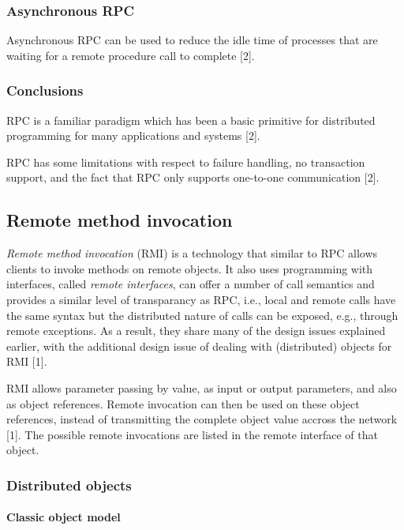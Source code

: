 \subsubsection{Asynchronous RPC}

Asynchronous RPC can be used to reduce the idle time of processes that are waiting for a remote procedure call to complete [2].



\subsubsection{Conclusions}

RPC is a familiar paradigm which has been a basic primitive for distributed programming for many applications and systems [2].

RPC has some limitations with respect to failure handling, no transaction support, and the fact that RPC only supports one-to-one communication [2].



\subsection{Remote method invocation}

\emph{Remote method invocation} (RMI) is a technology that similar to RPC allows clients to invoke methods on remote objects. It also uses programming with interfaces, called \emph{remote interfaces}, can offer a number of call semantics and provides a similar level of transparancy as RPC, i.e., local and remote calls have the same syntax but the distributed nature of calls can be exposed, e.g., through remote exceptions. As a result, they share many of the design issues explained earlier, with the additional design issue of dealing with (distributed) objects for RMI [1].

RMI allows parameter passing by value, as input or output parameters, and also as object references. Remote invocation can then be used on these object references, instead of transmitting the complete object value accross the network [1]. The possible remote invocations are listed in the remote interface of that object.


\subsubsection{Distributed objects}

\paragraph{Classic object model}

